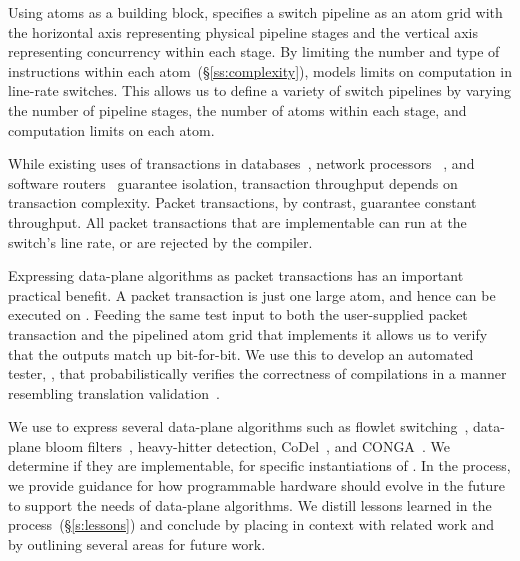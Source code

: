 Using atoms as a building block, \absmachine specifies a switch pipeline as an
atom grid with the horizontal axis representing physical pipeline stages and
the vertical axis representing concurrency within each stage.  By limiting the
number and type of instructions within each atom~(\S\ref{ss:complexity}),
\absmachine models limits on computation in line-rate switches. This allows us
to define a variety of switch pipelines by varying the number of pipeline
stages, the number of atoms within each stage, and computation limits on each atom.

While existing uses of transactions in databases~\cite{db_trans}, network
processors ~\cite{npus}, and software routers~\cite{click} guarantee isolation,
transaction throughput depends on transaction complexity. Packet transactions,
by contrast, guarantee constant throughput. All packet transactions that are
implementable can run at the switch's line rate, or are rejected by the compiler.

Expressing data-plane algorithms as packet transactions has an important
practical benefit.  A packet transaction is just one large atom, and hence can
be executed on \absmachine.  Feeding the same test input to both the
user-supplied packet transaction and the pipelined atom grid that implements it
allows us to verify that the outputs match up bit-for-bit. We use this to
develop an automated tester, \tester, that probabilistically verifies the
correctness of compilations in a manner resembling translation
validation~\cite{necula_validation}.

We use \pktlanguage to express several data-plane algorithms such as flowlet
switching~\cite{flowlet}, data-plane bloom filters~\cite{bloom}, heavy-hitter
detection, CoDel~\cite{codel}, and CONGA~\cite{conga}. We determine if they are
implementable, for specific instantiations of \absmachine. In the process, we
provide guidance for how programmable hardware should evolve in the future to
support the needs of data-plane algorithms.  We distill lessons learned in the
process~(\S\ref{s:lessons}) and conclude by placing \pktlanguage in context
with related work and by outlining several areas for future work.

